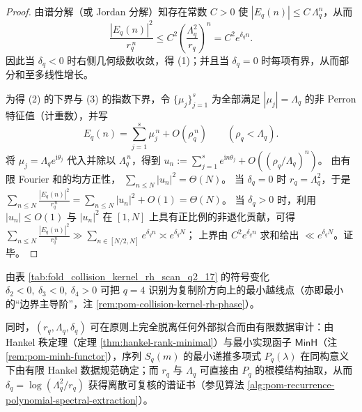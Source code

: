 \begin{proof}
由谱分解（或 Jordan 分解）知存在常数 \(C>0\) 使
\(
|E_q(n)|\le C\,\Lambda_q^n
\)，从而
\[
\frac{|E_q(n)|^2}{r_q^{\,n}}\le C^2\left(\frac{\Lambda_q^2}{r_q}\right)^n=C^2e^{\delta_q n}.
\]
因此当 \(\delta_q<0\) 时右侧几何级数收敛，得 (1)；并且当 \(\delta_q=0\) 时每项有界，从而部分和至多线性增长。
\par
为得 (2) 的下界与 (3) 的指数下界，令 \(\{\mu_j\}_{j=1}^{s}\) 为全部满足 \(|\mu_j|=\Lambda_q\) 的非 Perron 特征值（计重数），并写
\[
E_q(n)=\sum_{j=1}^{s}\mu_j^{\,n}+O(\rho_q^{\,n})
\qquad(\rho_q<\Lambda_q).
\]
将 \(\mu_j=\Lambda_q e^{\mathrm{i}\theta_j}\) 代入并除以 \(\Lambda_q^{\,n}\)，得到
\(
u_n:=\sum_{j=1}^{s}e^{\mathrm{i}n\theta_j}+O((\rho_q/\Lambda_q)^n)
\)。
由有限 Fourier 和的均方正性，
\(
\sum_{n\le N}|u_n|^2=\Theta(N)
\)。
当 \(\delta_q=0\) 时 \(r_q=\Lambda_q^2\)，于是
\(
\sum_{n\le N}\frac{|E_q(n)|^2}{r_q^{\,n}}
=\sum_{n\le N}|u_n|^2+O(1)=\Theta(N)
\)。
当 \(\delta_q>0\) 时，利用 \( |u_n|\le O(1)\) 与 \(|u_n|^2\) 在 \([1,N]\) 上具有正比例的非退化贡献，可得
\(
\sum_{n\le N}\frac{|E_q(n)|^2}{r_q^{\,n}}
\gg
\sum_{n\in[N/2,N]}e^{\delta_q n}
\asymp e^{\delta_q N}
\)；
上界由 \(C^2e^{\delta_q n}\) 求和给出 \(\ll e^{\delta_q N}\)。证毕。
\end{proof}

\begin{remark}[最小边界可见阶与离散证书化]\label{rem:pom-deltaq-minimal-visible-order-auditability}
由表 \ref{tab:fold_collision_kernel_rh_scan_q2_17} 的符号变化
\(
\delta_2<0,\ \delta_3<0,\ \delta_4>0
\)
可把 \(q=4\) 识别为复制阶方向上的最小越线点（亦即最小的“边界主导阶”，注 \ref{rem:pom-collision-kernel-rh-phase}）。
\par
同时，\((r_q,\Lambda_q,\delta_q)\) 可在原则上完全脱离任何外部拟合而由有限数据审计：由 Hankel 秩定理（定理 \ref{thm:hankel-rank-minimal}）与最小实现函子 \(\mathsf{MinH}\)（注 \ref{rem:pom-minh-functor}），序列 \(S_q(m)\) 的最小递推多项式 \(P_q(\lambda)\) 在同构意义下由有限 Hankel 数据规范确定；而 \(r_q\) 与 \(\Lambda_q\) 可直接由 \(P_q\) 的根模结构抽取，从而 \(\delta_q=\log(\Lambda_q^2/r_q)\) 获得离散可复核的谱证书（参见算法 \ref{alg:pom-recurrence-polynomial-spectral-extraction}）。
\end{remark}

